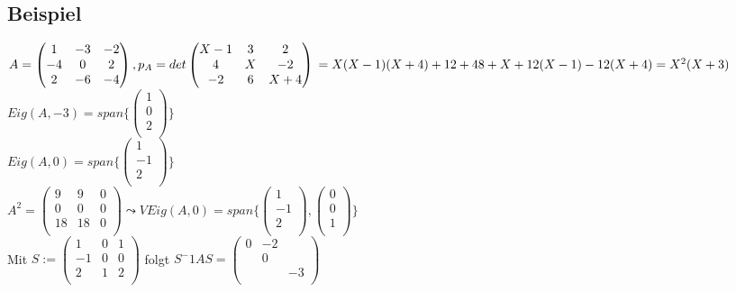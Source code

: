 \documentclass[a4paper, 12pt]{extarticle}
\begin{document}
\subsection*{Beispiel}
$A = \left( \begin{matrix}
	1 & -3 & -2\\
	-4 & 0 & 2\\
	2 & -6 & -4\\
\end{matrix} \right), 
p_A = det\left( \begin{matrix}
	X-1 & 3 & 2\\
	4 & X & -2\\
	-2 & 6 & X+4\\
\end{matrix} \right) \\
= X(X-1)(X+4) + 12 + 48 + X + 12(X-1) - 12(X+4) = X^2(X+3)$\\
$Eig(A,-3) = span\{ \left( \begin{matrix}
	1 \\
	0 \\
	2 \\
\end{matrix}\right)\}$\\
$Eig(A,0) = span\{ \left( \begin{matrix}
	1 \\
	-1 \\
	2 \\
\end{matrix}\right)\}$\\
$A^2 =\left( \begin{matrix}
	9 & 9 & 0 \\
	0 & 0 & 0 \\
	18 & 18 & 0 \\
\end{matrix}\right) \leadsto VEig(A,0) = span\{ 
\left( \begin{matrix}
1 \\
-1 \\
2 \\
\end{matrix} \right) ,
\left( \begin{matrix}
0 \\
0 \\
1 \\
\end{matrix} \right) \}$\\
Mit $S := 
\left( \begin{matrix}
	1 & 0 & 1 \\
	-1 & 0  & 0 \\
	2 & 1 & 2 \\
\end{matrix} \right)$ folgt $S^-1AS = 
\left( \begin{matrix}
	0 & -2 & \\
	& 0 \\
	 & & -3 \\
\end{matrix}\right)$ 
\end{document}
